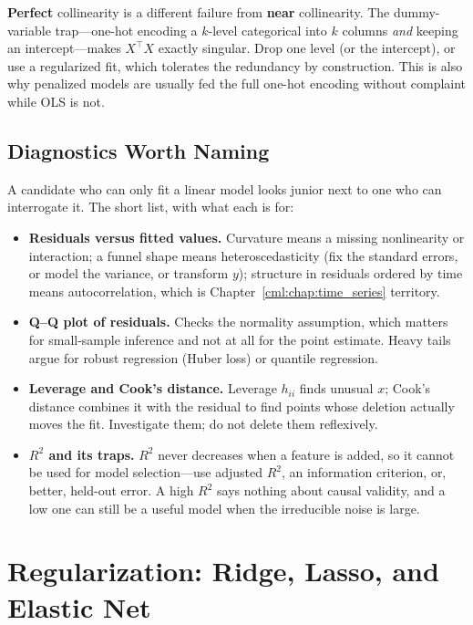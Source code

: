 \begin{warningbox}
\textbf{Perfect} collinearity is a different failure from \textbf{near} collinearity. The dummy-variable trap---one-hot encoding a $k$-level categorical into $k$ columns \emph{and} keeping an intercept---makes $X^{\top}X$ exactly singular. Drop one level (or the intercept), or use a regularized fit, which tolerates the redundancy by construction. This is also why penalized models are usually fed the full one-hot encoding without complaint while OLS is not.
\end{warningbox}

\subsection{Diagnostics Worth Naming}

A candidate who can only fit a linear model looks junior next to one who can interrogate it. The short list, with what each is for:

\begin{itemize}
    \item \textbf{Residuals versus fitted values.} Curvature means a missing nonlinearity or interaction; a funnel shape means heteroscedasticity (fix the standard errors, or model the variance, or transform $y$); structure in residuals ordered by time means autocorrelation, which is Chapter~\ref{cml:chap:time_series} territory.
    \item \textbf{Q--Q plot of residuals.} Checks the normality assumption, which matters for small-sample inference and not at all for the point estimate. Heavy tails argue for robust regression (Huber loss) or quantile regression.
    \item \textbf{Leverage and Cook's distance.} Leverage $h_{ii}$ finds unusual $x$; Cook's distance combines it with the residual to find points whose deletion actually moves the fit. Investigate them; do not delete them reflexively.
    \item \textbf{$R^2$ and its traps.} $R^2$ never decreases when a feature is added, so it cannot be used for model selection---use adjusted $R^2$, an information criterion, or, better, held-out error. A high $R^2$ says nothing about causal validity, and a low one can still be a useful model when the irreducible noise is large.
\end{itemize}

\section{Regularization: Ridge, Lasso, and Elastic Net}
\label{cml:sec:regularization}

